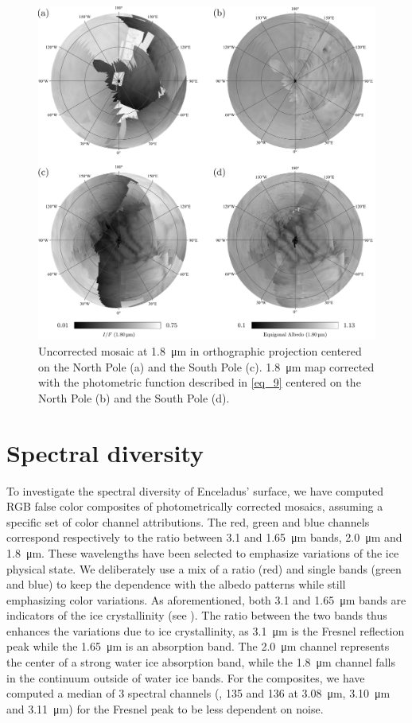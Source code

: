 \documentclass{arxiv-icarus}
\begin{document}
\begin{figure}[!ht]
    \includegraphics[width=.78\linewidth]{Fig_9}
    \caption{Uncorrected mosaic at \SI{1.8}{\um} in orthographic projection centered on the North Pole (a) and the South Pole (c). \SI{1.8}{\um} map corrected with the photometric function described in \eqref{eq_9} centered on the North Pole (b) and the South Pole (d).}
    \label{fig:fig_9}
\end{figure}


\section{Spectral diversity}\label{sec:sec_4}

To investigate the spectral diversity of Enceladus' surface, we have computed RGB false color composites of photometrically corrected mosaics, assuming a specific set of color channel attributions. The red, green and blue channels correspond respectively to the ratio between 3.1 and \SI{1.65}{\um} bands, \SI{2.0}{\um} and \SI{1.8}{\um}. These wavelengths have been selected to emphasize variations of the ice physical state. We deliberately use a mix of a ratio (red) and single bands (green and blue) to keep the dependence with the albedo patterns while still emphasizing color variations. As aforementioned, both \num{3.1} and \SI{1.65}{\um} bands are indicators of the ice crystallinity (see ). The ratio between the two bands thus enhances the variations due to ice crystallinity, as \SI{3.1}{\um} is the Fresnel reflection peak while the \SI{1.65}{\um} is an absorption band. The \SI{2.0}{\um} channel represents the center of a strong water ice absorption band, while the \SI{1.8}{\um} channel falls in the continuum outside of water ice bands. For the composites, we have computed a median of 3 spectral channels (, 135 and 136 at \SI{3.08}{\um}, \SI{3.10}{\um} and \SI{3.11}{\um}) for the Fresnel peak to be less dependent on noise.
\end{document}
